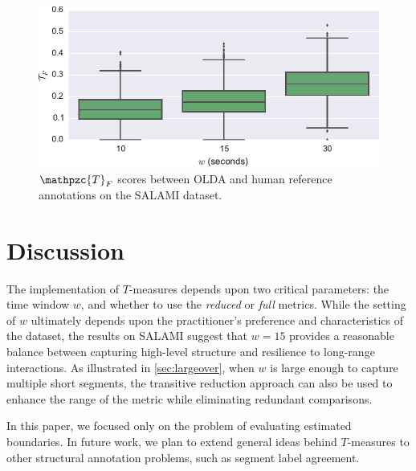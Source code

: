 \documentclass{article}
\def\shag{\ensuremath{\mathpzc{T}}}
\begin{document}
\begin{figure}[t]
    \centering
    \includegraphics[width=\columnwidth]{figs/salami-olda-stats}
    \caption{$\shag_F$ scores between OLDA and human reference annotations on the SALAMI dataset.}\label{fig:salami-olda-stats}
\end{figure}



\section{Discussion}\label{sec:conclusions}

The implementation of $T$-measures depends upon two critical parameters: the time window
$w$, and whether to use the \emph{reduced} or \emph{full} metrics.  While the setting of
$w$ ultimately depends upon the practitioner's preference and characteristics of the
dataset, the results on SALAMI suggest that $w=15$ provides a reasonable balance
between capturing high-level structure and resilience to long-range interactions.
As illustrated in \cref{sec:largeover}, when $w$ is large enough to capture multiple short
segments, the transitive reduction approach can also be used to enhance the range
of the metric while eliminating redundant comparisons.

In this paper, we focused only on the problem of evaluating estimated boundaries.
In future work, we plan to extend general ideas behind $T$-measures to other structural 
annotation problems, such as segment label agreement.


\end{document}
